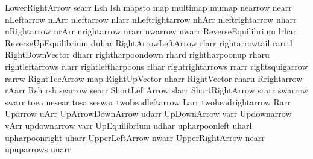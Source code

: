  LowerRightArrow          searr
 Lsh                      lsh
 mapsto                   map
 multimap                 mumap
 nearrow                  nearr
 nLeftarrow               nlArr
 nleftarrow               nlarr
 nLeftrightarrow          nhArr
 nleftrightarrow          nharr
 nRightarrow              nrArr
 nrightarrow              nrarr
 nwarrow                  nwarr
 ReverseEquilibrium       lrhar
 ReverseUpEquilibrium     duhar
 RightArrowLeftArrow      rlarr
 rightarrowtail           rarrtl
 RightDownVector          dharr
 rightharpoondown         rhard
 rightharpoonup           rharu
 rightleftarrows          rlarr
 rightleftharpoons        rlhar
 rightrightarrows         rrarr
 rightsquigarrow          rarrw
 RightTeeArrow            map
 RightUpVector            uharr
 RightVector              rharu
 Rrightarrow              rAarr
 Rsh                      rsh
 searrow                  searr
 ShortLeftArrow           slarr
 ShortRightArrow          srarr
 swarrow                  swarr
 toea                     nesear
 tosa                     seswar
 twoheadleftarrow         Larr
 twoheadrightarrow        Rarr
 Uparrow                  uArr
 UpArrowDownArrow         udarr
 UpDownArrow              varr
 Updownarrow              vArr
 updownarrow              varr
 UpEquilibrium            udhar
 upharpoonleft            uharl
 upharpoonright           uharr
 UpperLeftArrow           nwarr
 UpperRightArrow          nearr
 upuparrows               uuarr
